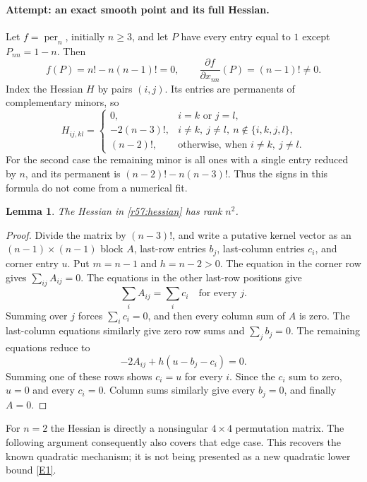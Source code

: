 \documentclass[11pt,a4paper]{article}
\newcommand{\eref}[2]{\hyperlink{extra:#1:#2}{[E#2]}}
\newtheorem{notebooklemma}{Lemma}[section]
\numberwithin{equation}{section}
\begin{document}
\paragraph{Attempt: an exact smooth point and its full Hessian.}
Let $f=\operatorname{per}_n$, initially $n\geq3$, and let $P$ have every entry equal to $1$ except $P_{nn}=1-n$. Then
\[
 f(P)=n!-n(n-1)!=0,
 \qquad \frac{\partial f}{\partial x_{nn}}(P)=(n-1)!\ne0.
\]
Index the Hessian $H$ by pairs $(i,j)$. Its entries are permanents of complementary minors, so
\begin{equation}\label{r57:hessian}
 H_{ij,kl}=\begin{cases}
 0,&i=k\text{ or }j=l,\\
 -2(n-3)!,&i\ne k,\ j\ne l,\ n\notin\{i,k,j,l\},\\
 (n-2)!,&\text{otherwise, when }i\ne k,\ j\ne l.
 \end{cases}
\end{equation}
For the second case the remaining minor is all ones with a single entry reduced by $n$, and its permanent is $(n-2)!-n(n-3)!$. Thus the signs in this formula do not come from a numerical fit.

\begin{notebooklemma}\label{r57:fullrank}
The Hessian in \eqref{r57:hessian} has rank $n^2$.
\end{notebooklemma}
\begin{proof}
Divide the matrix by $(n-3)!$, and write a putative kernel vector as an $(n-1)\times(n-1)$ block $A$, last-row entries $b_j$, last-column entries $c_i$, and corner entry $u$. Put $m=n-1$ and $h=n-2>0$. The equation in the corner row gives $\sum_{ij}A_{ij}=0$. The equations in the other last-row positions give
\[
 \sum_i A_{ij}=\sum_i c_i\quad\text{for every }j.
\]
Summing over $j$ forces $\sum_i c_i=0$, and then every column sum of $A$ is zero. The last-column equations similarly give zero row sums and $\sum_jb_j=0$. The remaining equations reduce to
\[
 -2A_{ij}+h(u-b_j-c_i)=0.
\]
Summing one of these rows shows $c_i=u$ for every $i$. Since the $c_i$ sum to zero, $u=0$ and every $c_i=0$. Column sums similarly give every $b_j=0$, and finally $A=0$.
\end{proof}

For $n=2$ the Hessian is directly a nonsingular $4\times4$ permutation matrix. The following argument consequently also covers that edge case. This recovers the known quadratic mechanism; it is not being presented as a new quadratic lower bound \eref{57}{1}.
\end{document}
